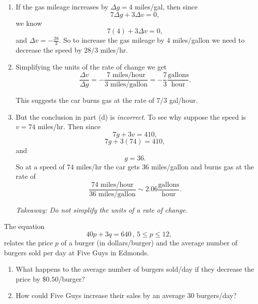 \documentclass{ximera}
\begin{document}
\begin{question}
\begin{explanation}
\begin{enumerate}
A second method is to start with the original equation
\[
         7g + 3v = 410
\]
and suppose the gas mileage changes from $g$ to $g+\Delta g$ and the speed changes from $v$ to $v+\Delta v$. Then 
\[
     7 ( g + \Delta g) + 3 (v + \Delta v) = 410.
\]
Distributing gives
\[
   (7g + 3v) + 7 \Delta g + 3 \Delta v = 410.
\]
But since $7g + 3v = 410$, 
\[ 
   7 \Delta g + 3 \Delta v = 0.
\]
Now substitute $\Delta v = -4$ to get
\[
  7 \Delta g + 3(-4) = 0
\]
and
\[
     \Delta g = \frac{12}{7}
\]
as before.

\item If the gas mileage increases by $\Delta g = 4$ miles/gal, then since 
\[ 
   7 \Delta g + 3 \Delta v = 0,
\]
we know
\[
 7(4) + 3\Delta v = 0 ,
\]
and $\Delta v = -\frac{28}{3}$. So to increase the gas mileage by $4$ miles/gallon we need to decrease the speed by $28/3$ miles/hr.

\item Simplifying the units of the rate of change we get
\[
   \frac{\Delta v}{\Delta g} =  -\frac{7\text{ miles/hour}}{3\text{ miles/gallon}} = -\frac{7}{3} \frac{\text{gallons}}{\text{hour}}.
\]

This suggests the car burns gas at the rate of $7/3$ gal/hour.

\item But the conclusion in part (d) is \emph{incorrect}. To see why suppose the speed is $v  = 74$ miles/hr. Then since
\[
 7g + 3v = 410,
\]
\[
  7g + 3(74) = 410,
\]
and
\[
 g = 36.
\]
So at a speed of $74$ miles/hr the car gets $36$ miles/gallon and burns gas at the rate of
\[
   \frac{74\text{ miles/hour}}{36\text{ miles/gallon}} \sim 2.06 \frac{\text{gallons}}{\text{hour}}.
\]

\emph{Takeaway: Do not simplify the units of a rate of change.}

\end{enumerate}
\end{explanation}
\end{question}


\begin{question} \label{Epvem3f3}
The equation
\[
   40p + 3q = 640 \, , \, 5\leq p \leq 12,
\]
relates the price $p$ of a burger (in dollars/burger) and the average number of burgers sold per day at Five Guys in Edmonds.

\begin{enumerate}
\item What happens to the average number of burgers sold/day if they decrease the price by $\$0.50$/burger?

\item How could Five Guys increase their sales by an average 30 burgers/day?
\end{enumerate}
\end{question}
\end{document}
